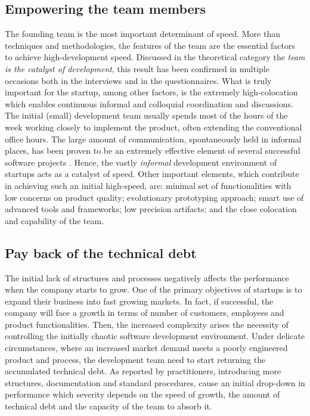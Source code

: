 \documentclass[10pt,journal,letterpaper,compsoc]{IEEEtran}
\begin{document}
\subsection{Empowering the team members}
The founding team is the most important determinant of speed. More than 
techniques and methodologies, the features of the team are the essential factors 
to achieve high-development speed. Discussed in the theoretical category the 
\textit{team is the catalyst of development}, this result has been confirmed in 
multiple occasions both in the interviews and in the questionnaires. What is 
truly important for the startup, among other factors, is the extremely 
high-colocation which enables continuous informal and colloquial coordination 
and discussions. The initial (small) development team usually spends most of the 
hours of the week working closely to implement the product, often extending the 
conventional office hours.  The large amount of communication, spontaneously 
held in informal places, has been proven to be an extremely effective element of 
several successful software projects \cite{Highsmith2000}. Hence, the vastly 
\textit{informal} development environment of startups acts as a catalyst of 
speed. Other important elements, which contribute in achieving such an initial 
high-speed, are: minimal set of functionalities with low concerns on product 
quality; evolutionary prototyping approach; smart use of advanced tools and 
frameworks; low precision artifacts; and the close colocation and capability of 
the team.

\subsection{Pay back of the technical debt}
The initial lack of structures and processes negatively affects the 
performance when the company starts to grow. One of the primary objectives of 
startups is to expand their business into fast growing markets. In fact, if 
successful, the company will face a growth in terms of number of customers, 
employees and product functionalities. Then, the increased complexity arises the 
necessity of controlling the initially chaotic software development environment. 
Under delicate circumstances, where an increased market demand meets a poorly 
engineered product and process,  the development team need to start returning 
the accumulated technical debt. As reported by practitioners, introducing more 
structures, documentation and standard procedures, cause an initial drop-down in 
performance which severity depends on the speed of growth, the amount of 
technical debt and the capacity of the team to absorb it. 
\end{document}

